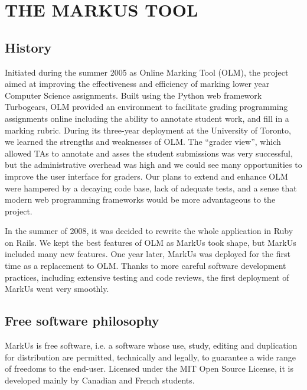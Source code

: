 \documentclass[twocolumn,10pt]{asme2e}
\begin{document}
\section*{THE MARKUS TOOL}



\subsection*{History}

Initiated during the summer 2005 as Online Marking Tool (OLM), the project aimed
at improving the effectiveness and efficiency of marking lower year Computer
Science assignments. Built using the Python web framework Turbogears, OLM
provided an environment to facilitate grading programming assignments online including the ability to annotate student work, and fill in a marking rubric. During its three-year deployment at the University of Toronto, we learned the strengths and weaknesses of OLM. The ``grader view'', which allowed TAs to annotate and asses the student submissions was very successful, but the administrative overhead was high and we could see many opportunities to improve the user interface for graders. Our plans to extend and enhance OLM were hampered by a decaying code base, lack of adequate tests, and a sense that modern web programming frameworks would be more advantageous to the project.

In the summer of 2008, it was decided to rewrite the whole application in Ruby on Rails. We kept the best features of OLM as MarkUs took shape, but MarkUs included many new features. One year later, MarkUs was deployed for the first time as a replacement to OLM. Thanks to more careful software development practices, including extensive testing and code reviews, the first deployment of MarkUs went very smoothly.

\subsection*{Free software philosophy}
MarkUs is free software, i.e. a software whose use, study, editing and duplication for distribution are permitted, technically and legally, to guarantee a wide range of freedoms to the end-user. Licensed under the MIT Open Source License, it is developed mainly by Canadian and French students.
\end{document}
